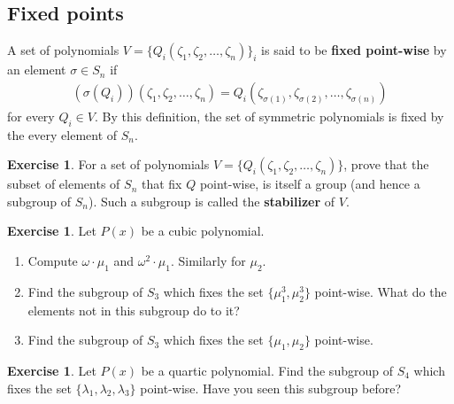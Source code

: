 \documentclass[reqno, 12pt, letter]{article}
\theoremstyle{plain}
\theoremstyle{definition}
\newtheorem{exercise}[theorem]{Exercise}
\theoremstyle{remark}
\numberwithin{equation}{section}
\newcommand{\hint}[1]{\footnote{{Hint:} #1\hfill}}
\let\footnote=\endnote
\begin{document}
	
	
	
	
	
	\subsection{Fixed points}
		A set of polynomials $ V = \{ Q_i(\zeta_1, \zeta_2, \dots, \zeta_n) \}_i$ is said to be \textbf{fixed point-wise} by an element $ \sigma \in S_n$ if 
			\begin{align*}
			(\sigma(Q_i))(\zeta_1, \zeta_2, \dots, \zeta_n) = Q_i(\zeta_{\sigma(1)}, \zeta_{\sigma(2)}, \dots, \zeta_{\sigma(n)})
			\end{align*}
		for every $ Q_i \in V$. By this definition, the set of symmetric polynomials is fixed by the every element of $ S_n$. 
		
		\begin{exercise}
			For a set of polynomials $ V = \{ Q_i(\zeta_1, \zeta_2, \dots, \zeta_n) \}$, prove that the subset of elements of $ S_n$ that fix $ Q$ point-wise, is itself a group (and hence a subgroup of $ S_n$). Such a subgroup is called the \textbf{stabilizer} of $ V$.
		\end{exercise}
		
		\begin{exercise} Let $ P(x)$ be a cubic polynomial. 
			\begin{enumerate}
				\item Compute $ \omega \cdot \mu_1$ and $ \omega^2\cdot \mu_1$. Similarly for $ \mu_2$.
				\item Find the subgroup of $ S_3$ which fixes the set $\{ \mu_1^3, \mu_2^3 \}$ point-wise. What do the elements not in this subgroup do to it?\hint{Don't forget that $ \omega^3 = 1$.}
				\item Find the subgroup of $ S_3$ which fixes the set $\{ \mu_1, \mu_2 \}$ point-wise.
			\end{enumerate}
		\end{exercise}
		
		\begin{exercise}
			Let $ P(x)$ be a quartic polynomial. Find the subgroup of $ S_4$ which fixes the set $ \{ \lambda_1,  \lambda_2, \lambda_3 \}$ point-wise. Have you seen this subgroup before?
		\end{exercise}
		
\end{document}
